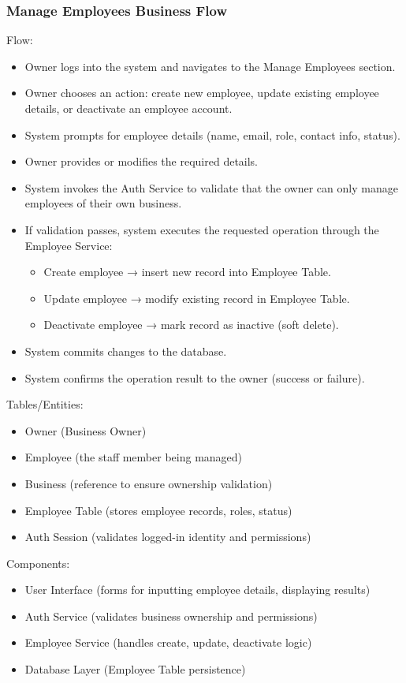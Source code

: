 \documentclass[]{VUMIFTemplateClass}
\begin{document}
\subsubsection{Manage Employees Business Flow}
Flow:
\begin{itemize}
\setlength{\itemsep}{2pt}
\setlength{\parskip}{0pt}
\setlength{\parsep}{0pt}
\item Owner logs into the system and navigates to the Manage Employees section.
\item Owner chooses an action: create new employee, update existing employee details, or deactivate an employee account.
\item System prompts for employee details (name, email, role, contact info, status).
\item Owner provides or modifies the required details.
\item System invokes the Auth Service to validate that the owner can only manage employees of their own
business.
\item If validation passes, system executes the requested operation through the Employee Service:
\begin{itemize}
\item Create employee → insert new record into Employee Table.
\item Update employee → modify existing record in Employee Table.
\item Deactivate employee → mark record as inactive (soft delete).
\end{itemize}
\item System commits changes to the database.
\item System confirms the operation result to the owner (success or failure).
\end{itemize}
Tables/Entities:
\begin{itemize}
\setlength{\itemsep}{2pt}
\setlength{\parskip}{0pt}
\setlength{\parsep}{0pt}
\item Owner (Business Owner)
\item Employee (the staff member being managed)
\item Business (reference to ensure ownership validation)
\item Employee Table (stores employee records, roles, status)
\item Auth Session (validates logged-in identity and permissions)
\end{itemize}
Components:
\begin{itemize}
\setlength{\itemsep}{2pt}
\setlength{\parskip}{0pt}
\setlength{\parsep}{0pt}
\item User Interface (forms for inputting employee details, displaying results)
\item Auth Service (validates business ownership and permissions)
\item Employee Service (handles create, update, deactivate logic)
\item Database Layer (Employee Table persistence)
\end{itemize}
\end{document}

